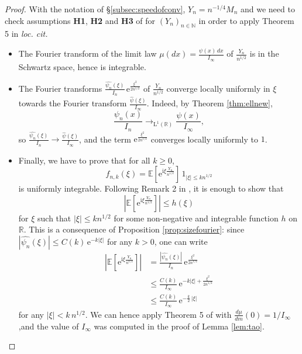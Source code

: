 \documentclass[12pt,a4paper,reqno]{amsart}
\newcommand{\N}{\mathbb{N}}
\newcommand{\R}{\mathbb{R}}
\newcommand{\E}{\mathrm{e}}
\newcommand{\I}{\mathrm{i}}
\newcommand{\esper}{\mathbb{E}}
\theoremstyle{remark}
\begin{document}
\begin{proof}
With the notation of \S\ref{subsec:speedofconv}, $Y_n=n^{-1/4} M_n$ and we need to check assumptions \textbf{H1}, \textbf{H2} and \textbf{H3} of \cite{DKN11} for $(Y_n)_{n\in \N}$ in order to apply Theorem 5 in \emph{loc. cit.} 
\begin{itemize}
	\item[$\bullet$ \textbf{H1.}] The Fourier transform of the limit law $\mu(dx)=\frac{\psi(x)\,dx}{I_\infty}$ of $\frac{Y_n}{n^{1/2}}$ is in the Schwartz space, hence is integrable.\vspace{2mm}
	\item[$\bullet$ \textbf{H2.}] The Fourier transforms $\frac{\widehat{\psi_n}(\xi)}{I_n}\,\E^{\frac{\xi^2}{2n^{1/2}}}$ of $\frac{Y_n}{n^{1/2}}$ converge locally uniformly in $\xi$ towards the Fourier transform $\frac{\widehat{\psi}(\xi)}{I_\infty}$. Indeed, by Theorem \ref{thm:ellnew}, $$\frac{\psi_n(x)}{I_n}\to_{\mathrm{L}^1(\R)}\frac{\psi(x)}{I_\infty},$$
	 so $\frac{\widehat{\psi_n}(\xi)}{I_n} \to \frac{\widehat{\psi}(\xi)}{I_\infty}$, and the term $\E^{\frac{\xi^2}{2n^{1/2}}}$ converges locally uniformly to $1$.\vspace{2mm}
	\item[$\bullet$ \textbf{H3.}] Finally, we have to prove that for all $k\geq0$, 
	$$f_{n,k}(\xi)=\esper\left[\E^{\I \xi \frac{Y_n}{n^{1/2}}}\right] \,1_{|\xi|\leq k n^{1/2}}$$ is uniformly integrable. Following Remark 2 in \cite{DKN11}, it is enough to show that 
	$$\left|\esper\left[\E^{\I \xi \frac{Y_n}{n^{1/2}}}\right]\right|\leq h(\xi)$$
	 for $\xi$ such that $|\xi|\leq k n^{1/2}$ for some non-negative and integrable function $h$ on $\R$. This is a consequence of Proposition \ref{prop:sizefourier}: since $|\widehat{\psi_n}(\xi)|\leq C(k)\,\E^{-k|\xi|}$ for any $k>0$, one can write
	 \begin{align*}
	 \left|\esper\left[\E^{\I \xi \frac{Y_n}{n^{1/2}}}\right]\right|&=\frac{|\widehat{\psi_n}(\xi)|}{I_n}\,\E^{\frac{\xi^2}{2n^{1/2}}} \\
	 &\leq \frac{C(k)}{I_\infty} \,\E^{-k|\xi|+\frac{\xi^2}{2n^{1/2}}} \\
	 &\leq \frac{C(k)}{I_\infty} \,\E^{-\frac{k}{2}\,|\xi|}
	 \end{align*}
	 for any $|\xi|<k\,n^{1/2}$. We can hence apply Theorem 5 of \cite{DKN11} with $\frac{d\mu}{dm}(0)=1/I_{\infty}$,and the value of $I_{\infty}$ was computed in the proof of Lemma \ref{lem:tao}.
\end{itemize}
\end{proof}
\end{document}
